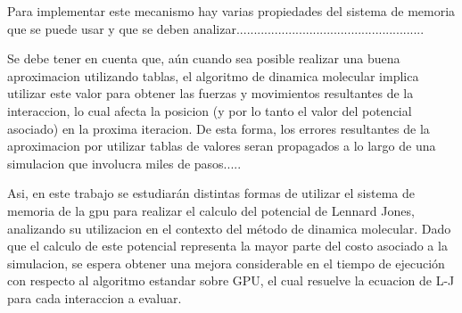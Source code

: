 \documentclass[a4paper,10pt]{report}
\begin{document}

Para implementar este mecanismo hay varias propiedades del sistema de memoria que se puede usar y que se deben analizar......................................................




Se debe tener en cuenta que, aún cuando sea posible realizar una buena aproximacion utilizando tablas, el algoritmo de dinamica molecular implica utilizar este valor para obtener las fuerzas y movimientos resultantes de la interaccion, lo cual afecta la posicion (y por lo tanto el valor del potencial asociado) en la proxima iteracion. De esta forma, los errores resultantes de la aproximacion por utilizar tablas de valores seran propagados a lo largo de una simulacion que involucra miles de pasos.....



Asi, en este trabajo se estudiarán distintas formas de utilizar el sistema de memoria de la gpu para realizar el calculo del potencial de Lennard Jones, analizando su utilizacion en el contexto del método de dinamica molecular. Dado que el calculo de este potencial representa la mayor parte del costo asociado a la simulacion, se espera obtener una mejora considerable en el tiempo de ejecución con respecto al algoritmo estandar sobre GPU, el cual resuelve la ecuacion de L-J para cada interaccion a evaluar.

\end{document}
